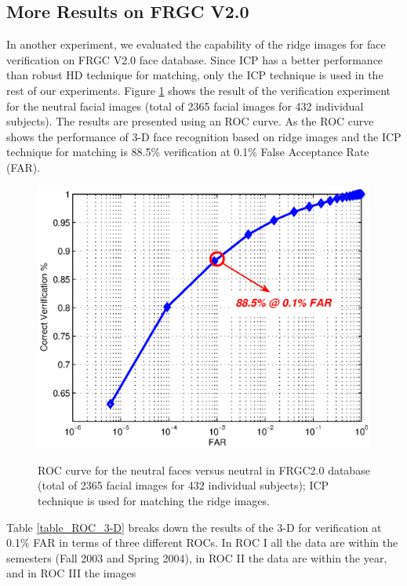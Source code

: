\subsection{More Results on FRGC V2.0} In another experiment, we evaluated the capability of the
ridge images for face verification on FRGC V2.0 face database. Since
ICP has a better performance than robust HD technique for matching,
only the ICP technique is used in the rest of our experiments.
Figure \ref{fig_results_Neutral_ROC} shows the result of the
verification experiment for the neutral facial images (total of 2365
facial images for 432 individual subjects). The results are
presented using an ROC curve. As the ROC curve shows the performance
of 3-D face recognition based on ridge images and the ICP technique
for matching is 88.5\% verification at 0.1\% False Acceptance Rate
(FAR).
\begin{figure}[tbp]
\begin{center}
  \includegraphics[scale = 0.5]{./chapters/Figures/results_3D_ICP_FRGC.eps}\\
  \caption{ROC curve for the neutral faces versus neutral in FRGC2.0 database (total of 2365 facial
images for 432 individual subjects); ICP technique is used for
matching the ridge images.}\label{fig_results_Neutral_ROC}
\end{center}
\end{figure}
Table \ref{table_ROC_3-D} breaks down the results of the 3-D for
verification at 0.1\% FAR in terms of three different ROCs. In ROC I
all the data are within the semesters (Fall 2003 and Spring 2004),
in ROC II the data are within the year, and in ROC III the images
